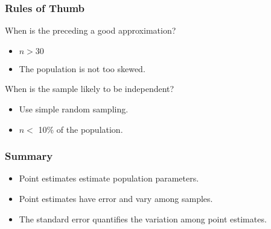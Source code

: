 \documentclass[t]{beamer}
\begin{document}
\begin{frame}
  \frametitle{Rules of Thumb}

  When is the preceding a good approximation?

  \begin{itemize}
  \item $n>30$
  \item The population is not too skewed.
  \end{itemize}

  When is the sample likely to be independent?

  \begin{itemize}
  \item Use simple random sampling.
  \item $n < $ 10\% of the population.
  \end{itemize}

  \note{

  }
\end{frame}

\begin{frame}
  \frametitle{Summary}

  \begin{itemize}
  \item Point estimates estimate population parameters.
  \item Point estimates have error and vary among samples.
  \item The standard error quantifies the variation among point estimates.
  \end{itemize}

  \note{

  }
\end{frame}
\end{document}
